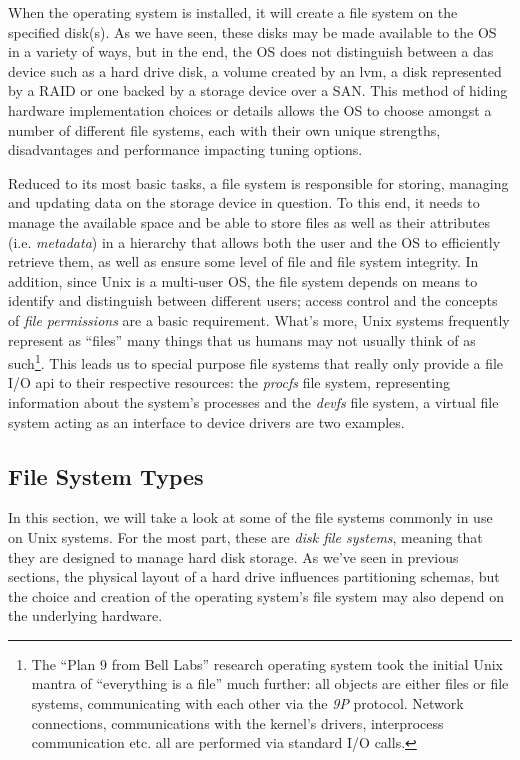 When the operating system is installed, it will create
a file system on the specified disk(s).  As we have
seen, these disks may be made available to the OS in a
variety of ways, but in the end, the OS does not
distinguish between a \gls{das} device such as a hard drive
disk, a volume created by an \gls{lvm}, a disk represented
by a RAID or one backed by a storage device over a
SAN.  This method of hiding hardware implementation
choices or details allows the OS to choose amongst a
number of different file systems, each with their own
unique strengths, disadvantages and performance
impacting tuning options.

Reduced to its most basic tasks, a file system is
responsible for storing, managing and updating data on
the storage device in question.  To this end, it needs
to manage the available space and be able to store
files as well as their attributes (i.e. {\em
metadata}) in a hierarchy that allows both the user
and the OS to efficiently retrieve them, as well as
ensure some level of file and file system integrity.
In addition, since Unix is a multi-user OS, the file
system depends on means to identify and distinguish
between different users; access control and the
concepts of {\em file permissions} are a basic
requirement.  What's more, Unix systems frequently
represent as ``files'' many things that us humans may
not usually think of as such\footnote{The ``Plan 9
from Bell Labs'' research
operating system took the initial Unix
mantra of ``everything is a file'' much further: all
objects are either files or file systems,
communicating with each other via the {\em 9P}
protocol.  Network connections, communications with
the kernel's drivers, interprocess communication etc.
all are performed via standard I/O calls.}.  This
leads us to special purpose file systems that really
only provide a file I/O \gls{api} to their respective
resources: the {\em procfs} file system,
representing information about the system's processes
and the {\em devfs} file system, a
virtual file system acting as an interface to device
drivers are two examples.

\subsection{File System Types}
\label{file systems:types}

In this section, we will take a look at some of the
file systems commonly in use on Unix systems.  For the
most part, these are {\em disk file systems}, meaning
that they are designed to manage hard disk storage.
As we've seen in previous sections, the physical
layout of a hard drive influences partitioning
schemas, but the choice and creation of the operating
system's file system may also depend on the underlying
hardware.


